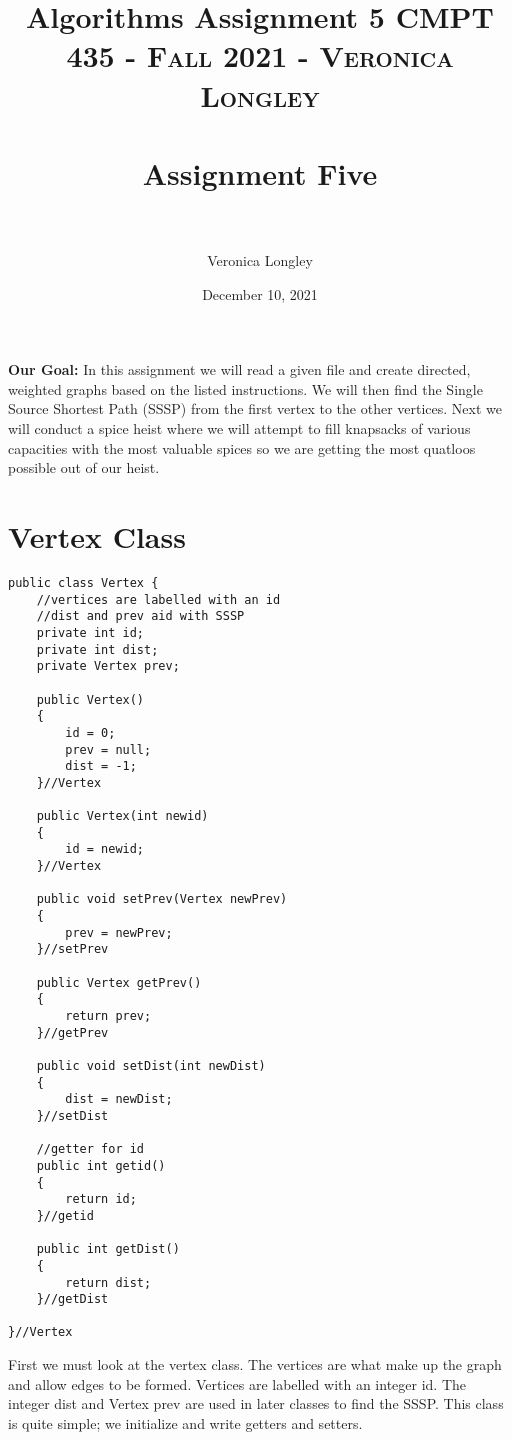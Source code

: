 \documentclass{article}
\title{\textbf{Algorithms Assignment 5}}
\author{Veronica Longley }
\date{December 10, 2021}
\title{	
   \normalfont \normalsize 
   \textsc{CMPT 435 - Fall 2021 - Veronica Longley} \\[10pt] %
   \horrule{0.5pt} \\[0.25cm] 	%
   \huge Assignment Five    	    \\ %
   \horrule{0.5pt} \\[0.25cm] 	%
}
\begin{document}
\lstset{numbers= left}
\lstset{language=Java}
\huge
\newcommand{\horrule}[1]{\rule{\linewidth}{#1}}

\maketitle{}


\pagebreak
\large
\textbf{Our Goal:}
In this assignment we will read a given file and create directed, weighted graphs based on the listed instructions. We will then find the Single Source Shortest Path (SSSP) from the first vertex to the other vertices. Next we will conduct a spice heist where we will attempt to fill knapsacks of various capacities with the most valuable spices so we are getting the most quatloos possible out of our heist.  

\small
\section{Vertex Class}
\begin{lstlisting}[frame =single,
backgroundcolor = \color{grey!12}]
public class Vertex {
	//vertices are labelled with an id
	//dist and prev aid with SSSP
	private int id;
	private int dist;
	private Vertex prev;

	public Vertex()
	{
		id = 0;
		prev = null;
		dist = -1;
	}//Vertex
	
	public Vertex(int newid)
	{
		id = newid;
	}//Vertex
	
	public void setPrev(Vertex newPrev)
	{
		prev = newPrev;
	}//setPrev
	
	public Vertex getPrev()
	{
		return prev;
	}//getPrev
	
	public void setDist(int newDist)
	{
		dist = newDist;
	}//setDist
	
	//getter for id 
	public int getid()
	{
		return id;
	}//getid
	
	public int getDist()
	{
		return dist;
	}//getDist

}//Vertex
\end{lstlisting}
\large
First we must look at the vertex class. The vertices are what make up the graph and allow edges to be formed. Vertices are labelled with an integer id. The integer dist and Vertex prev are used in later classes to find the SSSP. This class is quite simple; we initialize and write getters and setters. 

\small
\end{document}
